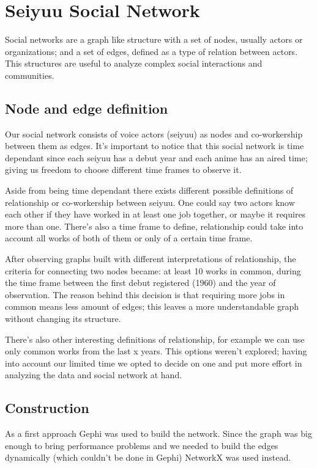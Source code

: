 \section{Seiyuu Social Network}
Social networks are a graph like structure with a set of nodes, usually actors or organizations; and a set of edges, defined as a type of relation between actors. This structures are useful to analyze complex social interactions and communities.

\subsection{Node and edge definition}
Our social network consists of voice actors (seiyuu) as nodes and co-workership between them as edges. It's important to notice that this social network is time dependant since each seiyuu has a debut year and each anime has an aired time; giving us freedom to choose different time frames to observe it.

Aside from being time dependant there exists different possible definitions of relationship or co-workership between seiyuu. One could say two actors know each other if they have worked in at least one job together, or maybe it requires more than one. There’s also a time frame to define, relationship could take into account all works of both of them or only of a certain time frame.

After observing graphs built with different interpretations of relationship, the criteria for connecting two nodes became: at least 10 works in common, during the time frame between the first debut registered (1960) and the year of observation.
The reason behind this decision is that requiring more jobs in common means less amount of edges; this leaves a more understandable graph without changing its structure.

There's also other interesting definitions of relationship, for example we can use only common works from the last x years. This options weren't explored; having into account our limited time we opted to decide on one and put more effort in analyzing the data and social network at hand.

\subsection{Construction}
As a first approach Gephi was used to build the network. Since the graph was big enough to bring performance problems and we needed to build the edges dynamically (which couldn't be done in Gephi) NetworkX was used instead.

